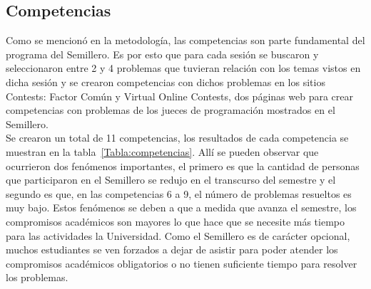 \documentclass[conference]{IEEEtran}
\begin{document}
\subsection{Competencias}
Como se mencionó en la metodología, las competencias son parte fundamental del programa del Semillero. Es por esto que para cada sesión se buscaron y seleccionaron entre 2 y 4 problemas que tuvieran relación con los temas vistos en dicha sesión y se crearon competencias con dichos problemas en los sitios Contests: Factor Común\cite{FactorComun} y Virtual Online Contests\cite{AhmedAly}, dos páginas web para crear competencias con problemas de los jueces de programación mostrados en el Semillero.\\
Se crearon un total de 11 competencias, los resultados de cada competencia se muestran en la tabla~\ref{Tabla:competencias}. Allí se pueden observar que ocurrieron dos fenómenos importantes, el primero es que la cantidad de personas que participaron en el Semillero se redujo en el transcurso del semestre y el segundo es que, en las competencias 6 a 9, el número de problemas resueltos es muy bajo. Estos fenómenos se deben a que a medida que avanza el semestre, los compromisos académicos son mayores lo que hace que se necesite más tiempo para las actividades la Universidad. Como el Semillero es de carácter opcional, muchos estudiantes se ven forzados a dejar de asistir para poder atender los compromisos académicos obligatorios o no tienen suficiente tiempo para resolver los problemas.
\end{document}
